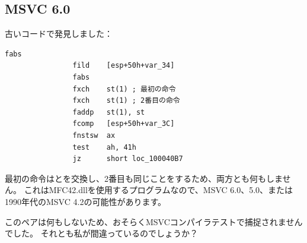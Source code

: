 \subsection{MSVC 6.0}

古いコードで発見しました：

\begin{lstlisting}[style=customasmx86]
                fabs
                fild    [esp+50h+var_34]
                fabs
                fxch    st(1) ; 最初の命令
                fxch    st(1) ; 2番目の命令
                faddp   st(1), st
                fcomp   [esp+50h+var_3C]
                fnstsw  ax
                test    ah, 41h
                jz      short loc_100040B7
\end{lstlisting}

最初の命令はとを交換し、2番目も同じことをするため、両方とも何もしません。
これはMFC42.dllを使用するプログラムなので、MSVC 6.0、5.0、または1990年代のMSVC 4.2の可能性があります。

このペアは何もしないため、おそらくMSVCコンパイラテストで捕捉されませんでした。
それとも私が間違っているのでしょうか？